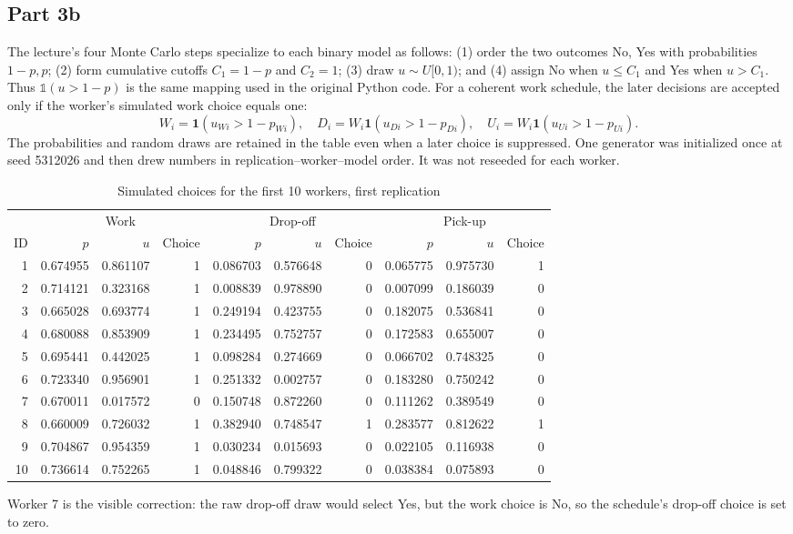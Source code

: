 \documentclass[11pt]{article}
\begin{document}
\subsection{Part 3b}
The lecture's four Monte Carlo steps specialize to each binary model as follows: (1) order the two outcomes No, Yes with probabilities $1-p,p$; (2) form cumulative cutoffs $C_1=1-p$ and $C_2=1$; (3) draw $u\sim U[0,1)$; and (4) assign No when $u\le C_1$ and Yes when $u>C_1$. Thus $\mathbb{1}(u>1-p)$ is the same mapping used in the original Python code. For a coherent work schedule, the later decisions are accepted only if the worker's simulated work choice equals one:
\begin{equation*}
W_i=\mathbf 1(u_{Wi}>1-p_{Wi}),\quad
D_i=W_i\mathbf 1(u_{Di}>1-p_{Di}),\quad
U_i=W_i\mathbf 1(u_{Ui}>1-p_{Ui}).
\end{equation*}
The probabilities and random draws are retained in the table even when a later choice is suppressed. One generator was initialized once at seed 5312026 and then drew numbers in replication--worker--model order. It was not reseeded for each worker.
\begin{table}[H]\centering\scriptsize\setlength{\tabcolsep}{3pt}
\caption{Simulated choices for the first 10 workers, first replication}\begin{tabular}{r|rrr|rrr|rrr}\toprule
&\multicolumn{3}{c|}{Work}&\multicolumn{3}{c|}{Drop-off}&\multicolumn{3}{c}{Pick-up}\\
ID & $p$ & $u$ & Choice & $p$ & $u$ & Choice & $p$ & $u$ & Choice\\\midrule
1 & 0.674955 & 0.861107 & 1 & 0.086703 & 0.576648 & 0 & 0.065775 & 0.975730 & 1\\
2 & 0.714121 & 0.323168 & 1 & 0.008839 & 0.978890 & 0 & 0.007099 & 0.186039 & 0\\
3 & 0.665028 & 0.693774 & 1 & 0.249194 & 0.423755 & 0 & 0.182075 & 0.536841 & 0\\
4 & 0.680088 & 0.853909 & 1 & 0.234495 & 0.752757 & 0 & 0.172583 & 0.655007 & 0\\
5 & 0.695441 & 0.442025 & 1 & 0.098284 & 0.274669 & 0 & 0.066702 & 0.748325 & 0\\
6 & 0.723340 & 0.956901 & 1 & 0.251332 & 0.002757 & 0 & 0.183280 & 0.750242 & 0\\
7 & 0.670011 & 0.017572 & 0 & 0.150748 & 0.872260 & 0 & 0.111262 & 0.389549 & 0\\
8 & 0.660009 & 0.726032 & 1 & 0.382940 & 0.748547 & 1 & 0.283577 & 0.812622 & 1\\
9 & 0.704867 & 0.954359 & 1 & 0.030234 & 0.015693 & 0 & 0.022105 & 0.116938 & 0\\
10 & 0.736614 & 0.752265 & 1 & 0.048846 & 0.799322 & 0 & 0.038384 & 0.075893 & 0\\
\bottomrule\end{tabular}\end{table}
Worker 7 is the visible correction: the raw drop-off draw would select Yes, but the work choice is No, so the schedule's drop-off choice is set to zero.
\end{document}
